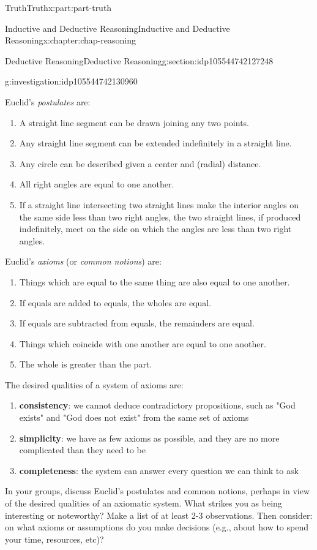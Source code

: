 \documentclass[oneside,10pt,]{book}
\newcommand{\terminology}[1]{\textbf{#1}}
\numberwithin{equation}{section}
\begin{document}
\begin{partptx}{Truth}{}{Truth}{}{}{x:part:part-truth}
\begin{chapterptx}{Inductive and Deductive Reasoning}{}{Inductive and Deductive Reasoning}{}{}{x:chapter:chap-reasoning}
\begin{sectionptx}{Deductive Reasoning}{}{Deductive Reasoning}{}{}{g:section:idp105544742127248}
\begin{investigation}{}{g:investigation:idp105544742130960}
\par
Euclid's \emph{postulates} are:%
%
\begin{enumerate}
\item{}A straight line segment can be drawn joining any two points.%
\item{}Any straight line segment can be extended indefinitely in a straight line.%
\item{}Any circle can be described given a center and (radial) distance.%
\item{}All right angles are equal to one another.%
\item{}If a straight line intersecting two straight lines make the interior angles on the same side less than two right angles, the two straight lines, if produced indefinitely, meet on the side on which the angles are less than two right angles.%
\end{enumerate}
Euclid's \emph{axioms} (or \emph{common notions}) are:%
%
\begin{enumerate}
\item{}Things which are equal to the same thing are also equal to one another.%
\item{}If equals are added to equals, the wholes are equal.%
\item{}If equals are subtracted from equals, the remainders are equal.%
\item{}Things which coincide with one another are equal to one another.%
\item{}The whole is greater than the part.%
\end{enumerate}
The desired qualities of a system of axioms are:%
%
\begin{enumerate}
\item{}\terminology{consistency}: we cannot deduce contradictory propositions, such as "God exists" and "God does not exist" from the same set of axioms%
\item{}\terminology{simplicity}: we have as few axioms as possible, and they are no more complicated than they need to be%
\item{}\terminology{completeness}: the system can answer every question we can think to ask%
\end{enumerate}
In your groups, discuss Euclid's postulates and common notions, perhaps in view of the desired qualities of an axiomatic system. What strikes you as being interesting or noteworthy? Make a list of at least 2-3 observations. Then consider: on what axioms or assumptions do you make decisions (e.g., about how to spend your time, resources, etc)?%

\end{investigation}
\end{sectionptx}
\end{chapterptx}
\end{partptx}
\end{document}
